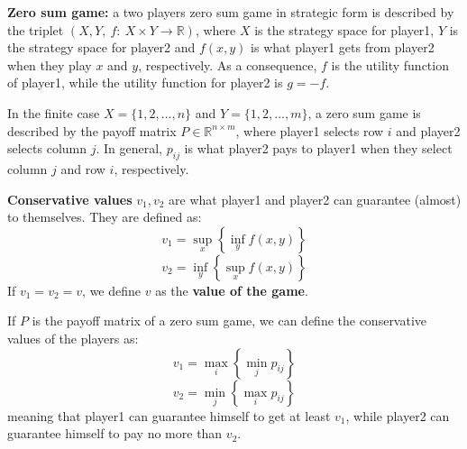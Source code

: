 
%


\noindent \textbf{Zero sum game:} a two players zero sum game in strategic form 
is described by the triplet $(X,Y,~f:~X \times Y \rightarrow \mathbb{R})$, 
where $X$ is the strategy space for player1, $Y$ is the strategy space for 
player2 and $f(x,y)$ is what player1 gets from player2 when they play $x$ and 
$y$, respectively. As a consequence, $f$ is the utility function of player1, 
while the utility function for player2 is $g = -f$.

\noindent In the finite case $X = \{1,2,...,n\}$ and $Y = \{1,2,...,m\}$, 
a zero sum game is described by the payoff matrix 
$P \in \mathbb{R}^{n \times m}$, where player1 selects row $i$ and player2 
selects column $j$. In general, $p_{ij}$ is what player2 pays to player1 
when they select column $j$ and row $i$, respectively.

\bigskip
\noindent \textbf{Conservative values} $v_1, v_2$ are what player1 and player2 
can guarantee (almost) to themselves. They are defined as:
\[
	v_1 = \sup_x\left\{\inf_y f(x,y)\right\}
\]
\[
	v_2 = \inf_y\left\{\sup_x f(x,y)\right\}
\]
If $v_1 = v_2 = v$, we define $v$ as the \textbf{value of the game}.

\noindent If $P$ is the payoff matrix of a zero sum game, we can define the 
conservative values of the players as:
\[
	v_1 = \max_i\left\{\min_j p_{ij}\right\}
\]
\[
	v_2 = \min_j\left\{\max_i p_{ij}\right\}
\]
meaning that player1 can guarantee himself to get at least $v_1$, while player2 
can guarantee himself to pay no more than $v_2$.

